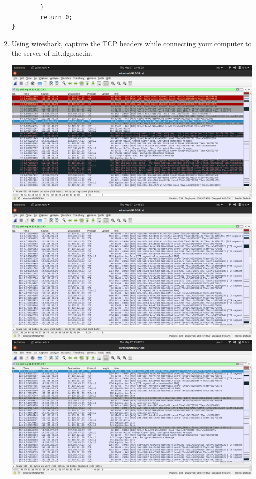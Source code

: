 \documentclass{article}
\begin{document}
\begin{enumerate}
\begin{lstlisting}
        }
        return 0;
}

\end{lstlisting}
\pagebreak
\item Using wireshark, capture the TCP headers while connecting your computer to the
server of nit.dgp.ac.in.
\begin{flushleft}
\includegraphics[width=700pt]{Question21}
\includegraphics[width=700pt]{Question22}
\includegraphics[width=700pt]{Question23}

\end{flushleft}
\end{enumerate}
\end{document}

